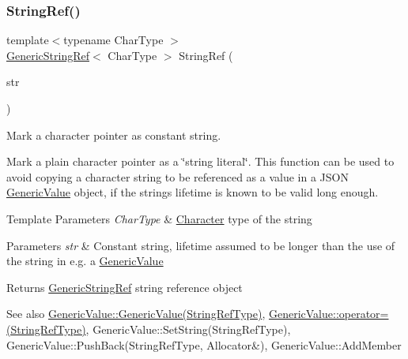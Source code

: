 \subsubsection{\texorpdfstring{String\+Ref()}{StringRef()}\hspace{0.1cm}{\footnotesize\ttfamily [1/2]}}
{\footnotesize\ttfamily template$<$typename Char\+Type $>$ \\
\hyperlink{structGenericStringRef}{Generic\+String\+Ref}$<$ Char\+Type $>$ String\+Ref (\begin{DoxyParamCaption}\item[{const Char\+Type $\ast$}]{str }\end{DoxyParamCaption})\hspace{0.3cm}{\ttfamily [related]}}



Mark a character pointer as constant string. 

Mark a plain character pointer as a \char`\"{}string literal\char`\"{}. This function can be used to avoid copying a character string to be referenced as a value in a J\+S\+ON \hyperlink{classGenericValue}{Generic\+Value} object, if the string\textquotesingle{}s lifetime is known to be valid long enough. 
\begin{DoxyTemplParams}{Template Parameters}
{\em Char\+Type} & \hyperlink{structCharacter}{Character} type of the string \\
\hline
\end{DoxyTemplParams}

\begin{DoxyParams}{Parameters}
{\em str} & Constant string, lifetime assumed to be longer than the use of the string in e.\+g. a \hyperlink{classGenericValue}{Generic\+Value} \\
\hline
\end{DoxyParams}
\begin{DoxyReturn}{Returns}
\hyperlink{structGenericStringRef}{Generic\+String\+Ref} string reference object
\end{DoxyReturn}
\begin{DoxySeeAlso}{See also}
\hyperlink{classGenericValue_abb2887958974fef1b2b5c8e32cc72ddb}{Generic\+Value\+::\+Generic\+Value(\+String\+Ref\+Type)}, \hyperlink{classGenericValue_a386708557555e6389184de608af5e6a6}{Generic\+Value\+::operator=(\+String\+Ref\+Type)}, Generic\+Value\+::\+Set\+String(\+String\+Ref\+Type), Generic\+Value\+::\+Push\+Back(\+String\+Ref\+Type, Allocator\&), Generic\+Value\+::\+Add\+Member 
\end{DoxySeeAlso}
\mbox{\label{structGenericStringRef_a578c51ab574a50a9c760b9da7c7562f2}} 
